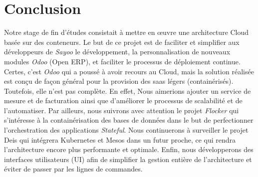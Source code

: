 \chapter*{Conclusion}

\begin{onehalfspace}
\initial
Notre stage de fin d'études consistait à mettre en œuvre une architecture Cloud basée sur des conteneurs. Le but de ce projet est de faciliter et simplifier aux développeurs de \emph{Sayoo} le développement, la personnalisation de nouveaux modules \emph{Odoo} (Open ERP), et faciliter le processus de déploiement continue.
\newline
\newline
Certes, c'est \emph{Odoo} qui a poussé à avoir recours au Cloud, mais la solution réalisée est conçu de façon général pour la provision des \acrshort{saas} légers (containérisés). Toutefois, elle n'est pas complète. En effet, Nous aimerions ajouter un service de mesure et de facturation ainsi que d'améliorer le processus de scalabilité et de l'automatiser.
\newline
\newline
\noindent Par ailleurs, nous suivrons avec attention le projet \emph{Flocker} qui s'intéresse à la containérisation des bases de données dans le but de perfectionner l'orchestration des applications \emph{Stateful}. Nous continuerons à surveiller le projet Deis qui intégrera Kubernetes et Mesos dans un futur proche, ce qui rendra l'architecture encore plus performante et optimale. Enfin, nous développerons des interfaces utilisateurs (UI) afin de simplifier la gestion entière de l'architecture et éviter de passer par les lignes de commandes.  	
\newline
\newline
\end{onehalfspace}